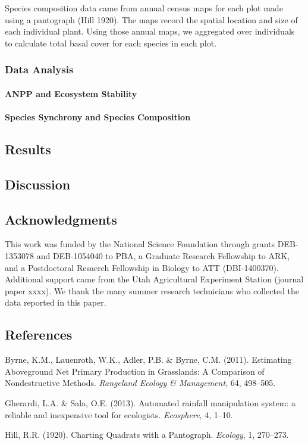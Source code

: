 \documentclass[12pt,]{article}
\let\oldparagraph\paragraph
\renewcommand{\paragraph}[1]{\oldparagraph{#1}\mbox{}}
\begin{document}
Species composition data came from annual census maps for each plot made
using a pantograph (Hill 1920). The maps record the spatial location and
size of each individual plant. Using those annual maps, we aggregated
over individuals to calculate total basal cover for each species in each
plot.

\subsubsection{Data Analysis}\label{data-analysis}

\paragraph{ANPP and Ecosystem
Stability}\label{anpp-and-ecosystem-stability}

\paragraph{Species Synchrony and Species
Composition}\label{species-synchrony-and-species-composition}

\subsection{Results}\label{results}

\subsection{Discussion}\label{discussion}

\subsection{Acknowledgments}\label{acknowledgments}

This work was funded by the National Science Foundation through grants
DEB-1353078 and DEB-1054040 to PBA, a Graduate Research Fellowship to
ARK, and a Postdoctoral Resaerch Fellowship in Biology to ATT
(DBI-1400370). Additional support came from the Utah Agricultural
Experiment Station (journal paper xxxx). We thank the many summer
research technicians who collected the data reported in this paper.

\singlespace
\setlength{\parindent}{0ex}

\subsection*{References}\label{references}

\hypertarget{refs}{}
\hypertarget{ref-Byrne2011}{}
Byrne, K.M., Lauenroth, W.K., Adler, P.B. \& Byrne, C.M. (2011).
Estimating Aboveground Net Primary Production in Grasslands: A
Comparison of Nondestructive Methods. \emph{Rangeland Ecology \&
Management}, 64, 498--505.

\hypertarget{ref-Gherardi2013}{}
Gherardi, L.A. \& Sala, O.E. (2013). Automated rainfall manipulation
system: a reliable and inexpensive tool for ecologists.
\emph{Ecosphere}, 4, 1--10.

\hypertarget{ref-Hill1920}{}
Hill, R.R. (1920). Charting Quadrats with a Pantograph. \emph{Ecology},
1, 270--273.
\end{document}
